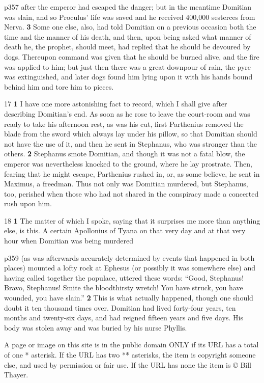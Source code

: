 p357 after the emperor had escaped the danger; but in the meantime Domitian was slain, and so Proculus' life was saved and he received 400,000 sesterces from Nerva. \textbf{3} Some one else, also, had told Domitian on a previous occasion both the time and the manner of his death, and then, upon being asked what manner of death he, the prophet, should meet, had replied that he should be devoured by dogs. Thereupon command was given that he should be burned alive, and the fire was applied to him; but just then there was a great downpour of rain, the pyre was extinguished, and later dogs found him lying upon it with his hands bound behind him and tore him to pieces.

17
\textbf{1} I have one more astonishing fact to record, which I shall give after describing Domitian's end. As soon as he rose to leave the court-room and was ready to take his afternoon rest, as was his cut, first Parthenius removed the blade from the sword which always lay under his pillow, so that Domitian should not have the use of it, and then he sent in Stephanus, who was stronger than the others. \textbf{2} Stephanus smote Domitian, and though it was not a fatal blow, the emperor was nevertheless knocked to the ground, where he lay prostrate. Then, fearing that he might escape, Parthenius rushed in, or, as some believe, he sent in Maximus, a freedman. Thus not only was Domitian murdered, but Stephanus, too, perished when those who had not shared in the conspiracy made a concerted rush upon him.

18
\textbf{1} The matter of which I spoke, saying that it surprises me more than anything else, is this. A certain Apollonius of Tyana on that very day and at that very hour when Domitian was being murdered

p359 (as was afterwards accurately determined by events that happened in both places) mounted a lofty rock at Ephesus (or possibly it was somewhere else) and having called together the populace, uttered these words: ``Good, Stephanus! Bravo, Stephanus! Smite the bloodthirsty wretch! You have struck, you have wounded, you have slain.'' \textbf{2} This is what actually happened, though one should doubt it ten thousand times over. Domitian had lived forty-four years, ten months and twenty-six days, and had reigned fifteen years and five days. His body was stolen away and was buried by his nurse Phyllis.

A page or image on this site is in the public domain ONLY if its URL has a total of one * asterisk. If the URL has two ** asterisks, the item is copyright someone else, and used by permission or fair use. If the URL has none the item is \emph{©} Bill Thayer.

